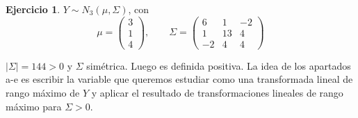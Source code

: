 \documentclass[12pt,spanish]{article}
\theoremstyle{definition}
\newtheorem{exercise}{Ejercicio}
\begin{document}
\begin{exercise} %
  $Y\sim N_3(\mu,\Sigma)$, con
  \[\mu=
    \begin{pmatrix}
      3 \\
      1 \\
      4
    \end{pmatrix},\qquad \Sigma=
    \begin{pmatrix}
      6 & 1 & -2 \\
      1 & 13 & 4 \\
      -2 & 4 & 4
    \end{pmatrix}
  \]

  $|\Sigma|=144>0$ y $\Sigma$ simétrica. Luego es definida
  positiva. La idea de los apartados a-e es escribir la variable que
  queremos estudiar como una transformada lineal de rango máximo de
  $Y$ y aplicar el resultado de transformaciones lineales de rango
  máximo para $\Sigma>0$.
  

\end{exercise}
\end{document}
